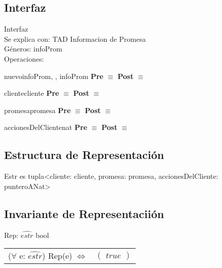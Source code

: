 \subsection{Interfaz}
	\noindent Interfaz \\
	Se explica con: TAD Informacion de Promesa\\
	G\'{e}neros: infoProm\\
	
	Operaciones:\\
	
	\begin{interfaz}{nuevoinfoProm}{, , }{infoProm}{}
	\textbf{Pre} $\equiv$
	\textbf{Post} $\equiv$
	\end{interfaz}
	
	\begin{interfaz}{cliente}{}{cliente}{}
	\textbf{Pre} $\equiv$
	\textbf{Post} $\equiv$
	\end{interfaz}
	
	\begin{interfaz}{promesa}{}{promesa}{}
	\textbf{Pre} $\equiv$
	\textbf{Post} $\equiv$
	\end{interfaz}
	
	\begin{interfaz}{accionesDelCliente}{}{nat}{}
	\textbf{Pre} $\equiv$
	\textbf{Post} $\equiv$
	\end{interfaz}
	

\subsection{Estructura de Representaci\'on}

Estr es tupla<cliente: cliente, promesa: promesa, accionesDelCliente: punteroANat>


\subsection{Invariante de Representacii\'on}

	\noindent Rep: $\widehat{estr}$ \en bool\\
	\begin{tabular}[t]{@{} r @{} @{} l @{}}
	($\forall$ e: $\widehat{estr}$) Rep(e) $\Leftrightarrow$&
	$				
	\left(
	\begin{array}{l}
	true
	\end{array} 
	\right)$\\
	\end{tabular}\\\\
